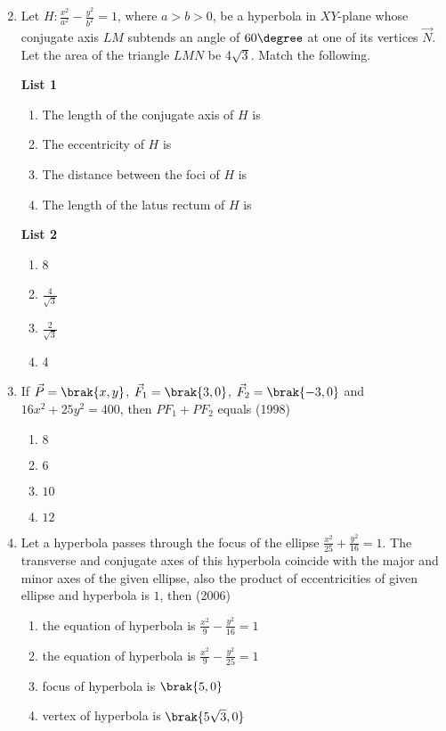 \begin{enumerate}[label=\thesubsection.\arabic*.,ref=\thesubsection.\theenumi]
\begin{multicols}{2}
\begin{enumerate}
\end{enumerate}
\end{multicols}


 \item Let $H : \frac{x^2}{a^2}-\frac{y^2}{b^2}= 1$, where $a>b>0$, be a hyperbola in $XY$-plane whose conjugate axis $LM$ subtends an angle of $60\degree$ at one of its vertices $\vec{N}$. Let the area of the triangle $LMN$ be 4$\sqrt{3}$.
Match the following.
\begin{multicols}{2}
\textbf{List 1}
\begin{enumerate}
    \item The length of the conjugate axis of $H$ is
    \item The eccentricity of $H$ is
    \item The distance between the foci of $H$ is
    \item The length of the latus rectum of $H$ is
\end{enumerate}
\columnbreak
\textbf{List 2}
\begin{enumerate}
    \item 8
    \item $\frac{4}{\sqrt{3}}$
    \item $\frac{2}{\sqrt{3}}$
    \item 4
\end{enumerate}
\end{multicols}
\item If $\vec{P}=\brak{x,y}$, $\vec{F}_{1}=\brak{3,0}$, $\vec{F}_{2}=\brak{-3,0}$ and $16x^2+25y^2=400$, then ${PF}_{1}+{PF}_{2}$ equals \hfill(1998)
	\begin{multicols}{4}
	\begin{enumerate}
		\item $8$
		\item $6$
		\item $10$
		\item $12$
	\end{enumerate}\end{multicols}

\item Let a hyperbola passes through the focus of the ellipse $\frac{x^2}{25}+\frac{y^2}{16}=1$. The transverse and conjugate axes of this hyperbola coincide with the major and minor axes of the given ellipse, also the product of eccentricities of given ellipse and hyperbola is $1$, then \hfill (2006)
	\begin{multicols}{2}
	\begin{enumerate}
		\item the equation of hyperbola is $\frac{x^2}{9}-\frac{y^2}{16}=1$
		\item the equation of hyperbola is $\frac{x^2}{9}-\frac{y^2}{25}=1$
		\item focus of hyperbola is $\brak{5,0}$
		\item vertex of hyperbola is $\brak{5\sqrt{3},0}$
	\end{enumerate}\end{multicols}


\end{enumerate}
